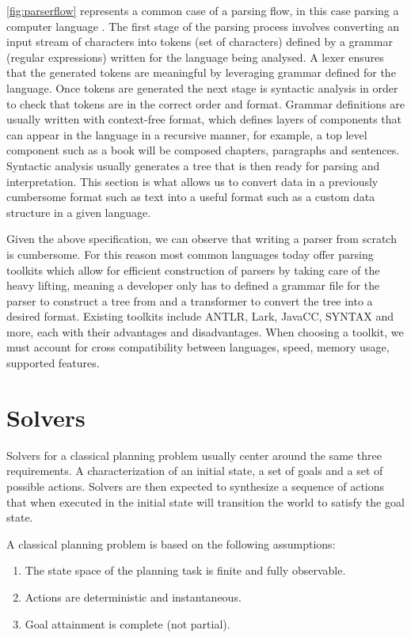 \ref{fig:parserflow} represents a common case of a parsing flow, in this case parsing a computer language \cite{ParsingW23:online}. The first stage of the parsing process involves converting an input stream of characters into tokens (set of characters) defined by a grammar (regular expressions) written for the language being analysed. A lexer ensures that the generated tokens are meaningful by leveraging grammar defined for the language. Once tokens are generated the next stage is syntactic analysis in order to check that tokens are in the correct order and format. Grammar definitions are usually written with context-free format, which defines layers of components that can appear in the language in a recursive manner, for example, a top level component such as a book will be composed chapters, paragraphs and sentences. Syntactic analysis usually generates a tree that is then ready for parsing and interpretation. This section is what allows us to convert data in a previously cumbersome format such as text into a useful format such as a custom data structure in a given language.

Given the above specification, we can observe that writing a parser from scratch is cumbersome. For this reason most common languages today offer parsing toolkits which allow for efficient construction of parsers by taking care of the heavy lifting, meaning a developer only has to defined a grammar file for the parser to construct a tree from and a transformer to convert the tree into a desired format. Existing toolkits include ANTLR, Lark, JavaCC, SYNTAX and more, each with their advantages and disadvantages. When choosing a toolkit, we must account for cross compatibility between languages, speed, memory usage, supported features.
\newpage
\section{Solvers}

Solvers for a classical planning problem usually center around the same three requirements. A characterization of an initial state, a set of goals and a set of possible actions. Solvers are then expected to synthesize a sequence of actions that when executed in the initial state will transition the world to satisfy the goal state.

A classical planning problem is based on the following assumptions:
\begin{enumerate}
\item  The state space of the planning task is finite and fully observable.
\item Actions are deterministic and instantaneous.
\item Goal attainment is complete (not partial).
\end{enumerate}

